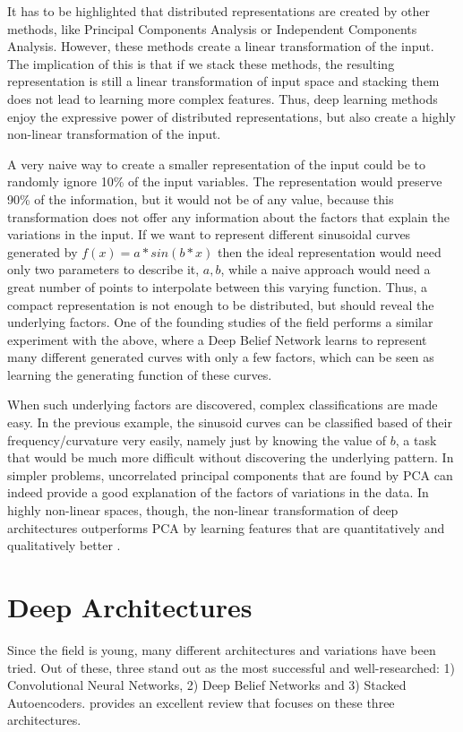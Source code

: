 \documentclass[a4paper]{article}
\begin{document}
		It has to be highlighted that distributed representations are created by other methods, like Principal Components Analysis or Independent Components Analysis. However, these methods create a linear transformation of the input. The implication of this is that if we stack these methods, the resulting representation is still a linear transformation of input space \cite{Bengio2007} and stacking them does not lead to learning more complex features. Thus, deep learning methods enjoy the expressive power of distributed representations, but also create a highly non-linear transformation of the input.
		
		A very naive way to create a smaller representation of the input could be to randomly ignore 10\% of the input variables. The representation would preserve 90\% of the information, but it would not be of any value, because this transformation does not offer any information about the factors that explain the variations in the input. If we want to represent different sinusoidal curves generated by $ f(x)=a*sin(b*x)$ then the ideal representation would need only two parameters to describe it, $a, b$, while a naive approach would need a great number of points to interpolate between this varying function. Thus, a compact representation is not enough to be distributed, but should reveal the underlying factors\cite{Bengio2013c}.	One of the founding studies of the field \cite{Hinton2006a} performs a similar experiment with the above, where a Deep Belief Network learns to represent many different generated curves with only a few factors, which can be seen as learning the generating function of these curves. 
		
		When such underlying factors are discovered, complex classifications are made easy. In the previous example, the sinusoid curves can be classified based of their frequency/curvature very easily, namely just by knowing the value of $b$, a task that would be much more difficult without discovering the underlying pattern.
		In simpler problems, uncorrelated principal components that are found by PCA can indeed provide a good explanation of the factors of variations in the data. In highly non-linear spaces, though, the non-linear transformation of deep architectures outperforms PCA by learning features that are quantitatively and qualitatively better \cite{Hinton2006}.	

	\section{Deep Architectures}
	\label{Architectures}
		Since the field is young, many different architectures and variations have been tried. Out of these, three stand out as the most successful and well-researched: 1) Convolutional Neural Networks, 2) Deep Belief Networks and 3) Stacked Autoencoders. \cite{Bengio2012} provides an excellent review that focuses on these three architectures.
		
\end{document}
